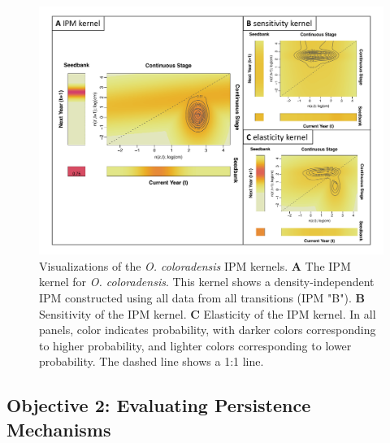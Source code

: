 \documentclass[12pt, letterpaper]{article}
\begin{document}
\begin{figure}[h]
  \centering
  \includegraphics[width=\textwidth]{figures/KernelMultipanelFigure.pdf}
  \caption{Visualizations of the \textit{O. coloradensis} IPM kernels. \textbf{A} The IPM kernel for \textit{O. coloradensis}. This kernel shows a density-independent IPM constructed using all data from all transitions (IPM "B"). \textbf{B} Sensitivity of the IPM kernel. \textbf{C} Elasticity of the IPM kernel. In all panels, color indicates probability, with darker colors corresponding to higher probability, and lighter colors corresponding to lower probability. The dashed line shows a 1:1 line. }
  \label{fig:IPMKernel}
\end{figure} 

\subsection{Objective 2: Evaluating Persistence Mechanisms}
\end{document}
